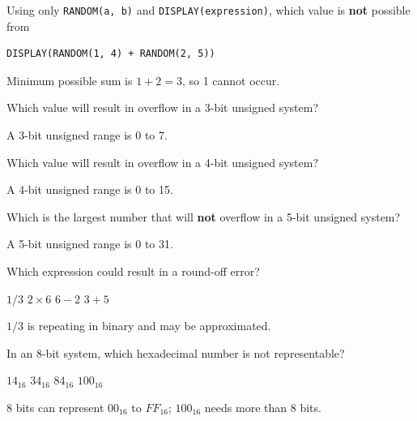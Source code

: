 \question[5]
Using only \texttt{RANDOM(a, b)} and \texttt{DISPLAY(expression)}, which value is \textbf{not} possible from
\begin{lstlisting}[style=pseudo]
DISPLAY(RANDOM(1, 4) + RANDOM(2, 5))
\end{lstlisting}
\begin{choices}
\end{choices}
\begin{solution}
  Minimum possible sum is \(1 + 2 = 3\), so 1 cannot occur.
\end{solution}

\question[5]
Which value will result in overflow in a 3-bit unsigned system?
\begin{choices}
\end{choices}
\begin{solution}
  A 3-bit unsigned range is 0 to 7.
\end{solution}

\question[5]
Which value will result in overflow in a 4-bit unsigned system?
\begin{choices}
\end{choices}
\begin{solution}
  A 4-bit unsigned range is 0 to 15.
\end{solution}

\newpage 

\question[5]
Which is the largest number that will \textbf{not} overflow in a 5-bit unsigned system?
\begin{choices}
\end{choices}
\begin{solution}
  A 5-bit unsigned range is 0 to 31.
\end{solution}


\question[5]
Which expression could result in a round-off error?
\begin{choices}
  \CorrectChoice \(1/3\)
  \choice \(2 \times 6\)
  \choice \(6 - 2\)
  \choice \(3 + 5\)
\end{choices}
\begin{solution}
  \(1/3\) is repeating in binary and may be approximated.
\end{solution}

\question[5]
In an 8-bit system, which hexadecimal number is not representable?
\begin{choices}
  \choice \(14_{16}\)
  \choice \(34_{16}\)
  \choice \(84_{16}\)
  \CorrectChoice \(100_{16}\)
\end{choices}
\begin{solution}
  8 bits can represent \(00_{16}\) to \(FF_{16}\); \(100_{16}\) needs more than 8 bits.
\end{solution}

